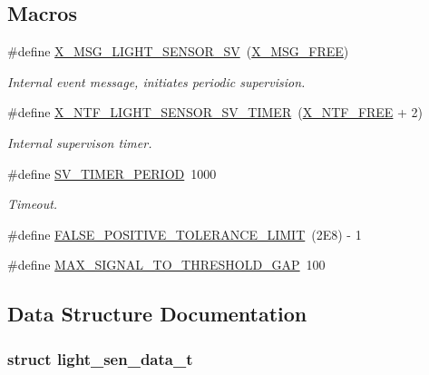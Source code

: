 \subsection*{Macros}
\begin{DoxyCompactItemize}
\item 
\#define \hyperlink{a00024_a5877f449ae4b7e77914fedf212c3d01f}{X\+\_\+\+M\+S\+G\+\_\+\+L\+I\+G\+H\+T\+\_\+\+S\+E\+N\+S\+O\+R\+\_\+\+S\+V}~(\hyperlink{a00036_a082eb6e82ded25b00f04da4f611c961e}{X\+\_\+\+M\+S\+G\+\_\+\+F\+R\+E\+E})
\begin{DoxyCompactList}\small\item\em Internal event message, initiates periodic supervision. \end{DoxyCompactList}\item 
\#define \hyperlink{a00024_ad7dfa3ed8d8d926ba462f9e951f1b391}{X\+\_\+\+N\+T\+F\+\_\+\+L\+I\+G\+H\+T\+\_\+\+S\+E\+N\+S\+O\+R\+\_\+\+S\+V\+\_\+\+T\+I\+M\+E\+R}~(\hyperlink{a00036_ab2eeea4643823a0c7c7731ddb83e3edc}{X\+\_\+\+N\+T\+F\+\_\+\+F\+R\+E\+E} + 2)
\begin{DoxyCompactList}\small\item\em Internal supervison timer. \end{DoxyCompactList}\item 
\#define \hyperlink{a00024_a8a535456285f4602701c814d7b69cc68}{S\+V\+\_\+\+T\+I\+M\+E\+R\+\_\+\+P\+E\+R\+I\+O\+D}~1000
\begin{DoxyCompactList}\small\item\em Timeout. \end{DoxyCompactList}\item 
\#define \hyperlink{a00024_aa88a423475bb5b13601785eed80fb1b9}{F\+A\+L\+S\+E\+\_\+\+P\+O\+S\+I\+T\+I\+V\+E\+\_\+\+T\+O\+L\+E\+R\+A\+N\+C\+E\+\_\+\+L\+I\+M\+I\+T}~(2\+E8) -\/ 1
\item 
\#define \hyperlink{a00024_a4131fea6179b36b90522dd6a9ecc0a73}{M\+A\+X\+\_\+\+S\+I\+G\+N\+A\+L\+\_\+\+T\+O\+\_\+\+T\+H\+R\+E\+S\+H\+O\+L\+D\+\_\+\+G\+A\+P}~100
\end{DoxyCompactItemize}


\subsection{Data Structure Documentation}
\label{d8/d2e/a00588}
\hypertarget{a00024_d8/d2e/a00588}{}
\subsubsection{struct light\+\_\+sen\+\_\+data\+\_\+t}


